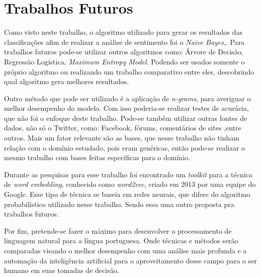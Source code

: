 \section{Trabalhos Futuros}\label{sec:8_trabfut}

Como visto neste trabalho, o algoritmo utilizado para gerar os resultados das classificações afim de realizar a análise de sentimento foi o \textit{Naive Bayes},. Para trabalhos futuros pode-se utilizar outros algoritmos como: Árvore de Decisão, Regressão Logística, \textit{Maximum Entropy Model}. Podendo ser usados somente o próprio algoritmo ou realizando um trabalho comparativo entre eles, descobrindo qual algoritmo gera melhores resultados.

Outro método que pode ser utilizado é a aplicação de \textit{n-grams}, para averiguar o melhor desempenho do modelo. Com isso poderia-se realizar testes de acurácia, que não foi o enfoque deste trabalho. Pode-se também utilizar outras fontes de dados, não só o Twitter, como: Facebook, fórums, comentários de sites ,entre outros. Mais um fator relevante são as bases, que nesse trabalho não tinham relação com o domínio estudado, pois eram genéricas, então pode-se realizar o mesmo trabalho com bases feitas específicas para o domínio.

Durante as pesquisas para esse trabalho foi encontrado um \textit{toolkit}  para a técnica de \textit{word embedding}, conhecido como \textit{word2vec}, criado em 2013 por uma equipe do Google. Esse tipo de técnica se baseia em redes neurais, que difere do algoritmo probabilístico utilizado nesse trabalho. Sendo essa uma outro proposta pra trabalhos futuros.

Por fim, pretende-se fazer o máximo para desenvolver o  processamento de linguagem natural para a língua portuguesa. Onde técnicas e métodos serão comparadas visando o melhor desempenho com uma análise mais profunda e a automação da inteligência artificial para o aproveitamento desse campo para o ser humano em suas tomadas de decisão. 
